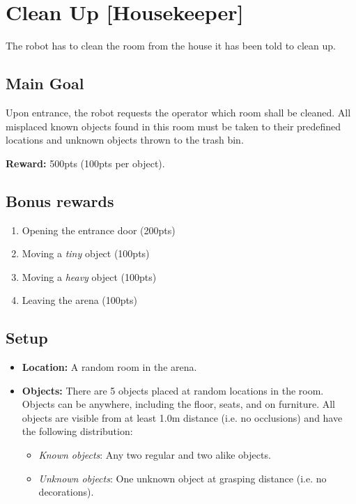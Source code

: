 \section{Clean Up [Housekeeper]}
The robot has to clean the room from the house it has been told to clean up.


\subsection{Main Goal}
Upon entrance, the robot requests the operator which room shall be cleaned.
All misplaced known objects found in this room must be taken to their predefined locations and unknown objects thrown to the trash bin.

\noindent\textbf{Reward:} 500pts (100pts per object).

\subsection{Bonus rewards}
\begin{enumerate}[nosep]
	\item Opening the entrance door (200pts)
	\item Moving a \emph{tiny} object (100pts)
	\item Moving a \emph{heavy} object (100pts)
	\item Leaving the arena (100pts)
\end{enumerate}


\subsection{Setup}
\begin{itemize}[nosep]
	\item \textbf{Location:} A random room in the arena.

	\item \textbf{Objects:} There are 5 objects placed at random locations in the room.
	Objects can be anywhere, including the floor, seats, and on furniture.
	All objects are visible from at least 1.0m distance (i.e. no occlusions) and have the following distribution:
	\begin{itemize}[nosep]
		\item\textit{Known objects}: Any two regular and two alike objects.
		\item\textit{Unknown objects}: One unknown object at grasping distance (i.e. no decorations).
	\end{itemize}
\end{itemize}

